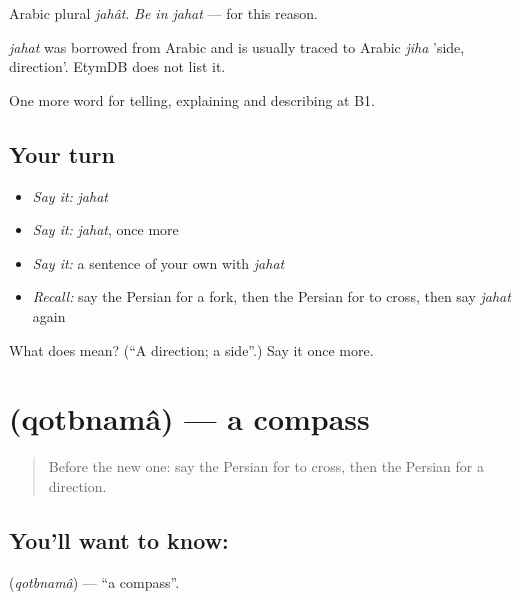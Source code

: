 Arabic plural \emph{jahât}. \emph{Be in jahat} — for this reason.

\begin{cousinweb}
\emph{jahat} was borrowed from Arabic and is usually traced to Arabic \emph{jiha} 'side, direction'. EtymDB does not list it.
\end{cousinweb}

\begin{grammarlens}[title={What you've built}]
One more word for telling, explaining and describing at B1.
\end{grammarlens}

\subsection*{Your turn}
\begin{itemize}
\raggedright
  \item \emph{Say it:} \emph{jahat}
  \item \emph{Say it:} \emph{jahat}, once more
  \item \emph{Say it:} a sentence of your own with \emph{jahat}
  \item \emph{Recall:} say the Persian for a fork, then the Persian for to cross, then say \emph{jahat} again
\end{itemize}

\begin{tcolorbox}[breakable,colback=teal!4,colframe=teal!35!black,title={Before you move on}]
What does  mean? (\textquotedblleft{}A direction; a side\textquotedblright{}.) Say it once more.
\end{tcolorbox}
\section[\texorpdfstring{\fa{قطب} \fa{نما} (qotbnamâ)}{قطب نما (qotbnamâ)}]{  (qotbnamâ) — a compass}

\label{lesson:FA-C446-qotbnama}



\begin{quote}
Before the new one: say the Persian for to cross, then the Persian for a direction.
\end{quote}

\subsection*{You'll want to know:  }
\textbf{ } (\emph{qotbnamâ}) — \textquotedblleft{}a compass\textquotedblright{}.

